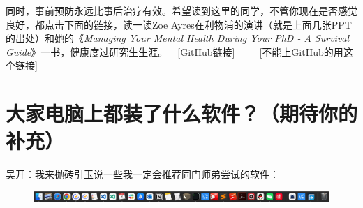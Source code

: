 同时，事前预防永远比事后治疗有效。希望读到这里的同学，不管你现在是否感觉良好，都点击下面的链接，读一读Zoe Ayres在利物浦的演讲（就是上面几张PPT的出处）和她的《\textit{Managing Your Mental Health During Your PhD - A Survival Guide}》一书，健康度过研究生生涯。~~\href{https://github.com/kaiwu-astro/xp_pgrs_unofficial_guide/tree/main/fileshare}{[GitHub链接]}~~~~~\href{https://cowtransfer.com/s/ca761995ed6945}{[不能上GitHub的用这个链接]}

\section{大家电脑上都装了什么软件？（期待你的补充）}

吴开：我来抛砖引玉说一些我一定会推荐同门师弟尝试的软件：
\begin{figure}[H]
    \includegraphics[width=\columnwidth]{author-folder/Kai.Wu/kai_mac_dock.jpg}
\end{figure}
